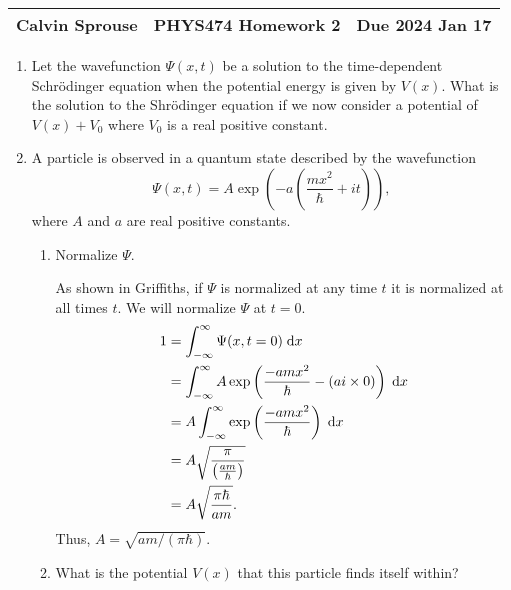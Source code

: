 \documentclass[a4paper, 12pt]{config/homework}
\begin{document}
\noindent
\begin{tabularx}{\textwidth}{>{\centering\arraybackslash}X>{\centering\arraybackslash}X>{\centering\arraybackslash}X}
Calvin Sprouse & PHYS474 Homework 2 & Due 2024 Jan 17\\
\midrule
\end{tabularx}

\begin{enumerate}
\item Let the wavefunction \(\Psi(x,t)\) be a solution to the time-dependent Schr{\"o}dinger equation when the potential energy is given by \(V(x)\). What is the solution to the Shr{\"o}dinger equation if we now consider a potential of \(V(x) + V_0\) where \(V_0\) is a real positive constant.

\pagebreak
\item A particle is observed in a quantum state described by the wavefunction
\[\Psi(x,t) = A\exp\left(-a\left(\frac{mx^2}{\hbar}+it\right)\right),\]
where \(A\) and \(a\) are real positive constants.
\begin{enumerate}[label=(\alph*)]
\item Normalize \(\Psi \).

As shown in Griffiths, if \(\Psi\) is normalized at any time \(t\) it is normalized at all times \(t\). We will normalize \(\Psi\) at \(t=0\).
\begin{align*}
1 &= \bint{-\infty}{\infty}{\Psi(x,t=0)}{x}
\\&= \bint{-\infty}{\infty}{A\exp\left(\frac{-amx^2}{\hbar} - (ai\times0)\right)}{x}
\\&= A \bint{-\infty}{\infty}{\exp\left(\frac{-amx^2}{\hbar}\right)}{x}
\\&= A \sqrt{\frac{\pi}{\left(\frac{am}{\hbar}\right)}}
\\&= A \sqrt{\frac{\pi\hbar}{am}}.
\end{align*}
Thus, \(A = \sqrt{am / (\pi\hbar)}\).

\pagebreak
\item What is the potential \(V(x)\) that this particle finds itself within?


\end{enumerate}
\end{enumerate}
\end{document}
